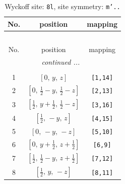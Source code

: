 \documentclass[fleqn,8pt]{jsarticle}
\begin{document}
\begin{longtable}{ccc}
\caption{Wyckoff site: {\tt 8l}, site symmetry: {\tt m'..}}
 \\
 \hline \hline
No. & position & mapping \\ \hline \endfirsthead

\multicolumn{2}{l}{\tablename\ \thetable{}} \\
 \hline \hline
No. & position & mapping \\ \hline \endhead

 \hline \hline
\multicolumn{2}{r}{\footnotesize\it continued ...} \\ \endfoot

 \hline \hline
\multicolumn{2}{r}{} \\ \endlastfoot

1 & $\left[ 0,\, y,\, z \right]$ & {\tt [1,14]} \\ \hline
2 & $\left[ 0,\, \frac{1}{2} - y,\, \frac{1}{2} - z \right]$ & {\tt [2,13]} \\ \hline
3 & $\left[ \frac{1}{2},\, y + \frac{1}{2},\, \frac{1}{2} - z \right]$ & {\tt [3,16]} \\ \hline
4 & $\left[ \frac{1}{2},\, - y,\, z \right]$ & {\tt [4,15]} \\ \hline
5 & $\left[ 0,\, - y,\, - z \right]$ & {\tt [5,10]} \\ \hline
6 & $\left[ 0,\, y + \frac{1}{2},\, z + \frac{1}{2} \right]$ & {\tt [6,9]} \\ \hline
7 & $\left[ \frac{1}{2},\, \frac{1}{2} - y,\, z + \frac{1}{2} \right]$ & {\tt [7,12]} \\ \hline
8 & $\left[ \frac{1}{2},\, y,\, - z \right]$ & {\tt [8,11]} \\
\end{longtable}
\renewcommand{\arraystretch}{1.2}
\end{document}
